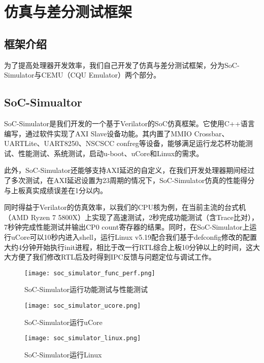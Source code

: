 \chapter{仿真与差分测试框架}

\section{框架介绍}

为了提高处理器开发效率，我们自己开发了仿真与差分测试框架，分为SoC-Simulator与CEMU（CQU Emulator）两个部分。

\section{SoC-Simualtor}

SoC-Simulator是我们开发的一个基于Verilator的SoC仿真框架。它使用C++语言编写，通过软件实现了AXI Slave设备功能。其内置了MMIO Crossbar、UARTLite、UART8250、NSCSCC confreg等设备，能够满足运行龙芯杯功能测试、性能测试、系统测试，启动u-boot、uCore和Linux的需求。

此外，SoC-Simulator还能够支持AXI延迟的自定义，在我们开发处理器期间经过了多次测试，在AXI延迟设置为23周期的情况下，SoC-Simulator仿真的性能得分与上板真实成绩误差在1分以内。

同时得益于Verilator的仿真效率，以我们的CPU核\cpuname 为例，在当前主流的台式机（AMD Ryzen 7 5800X）上实现了高速测试，2秒完成功能测试（含Trace比对），7秒钟完成性能测试并输出CP0 count寄存器的结果。同时，在SoC-Simulator上运行uCore可以10秒内进入shell，运行Linux v5.19配合我们基于defconfig修改的配置大约4分钟开始执行init进程，相比于改一行RTL综合上板10分钟以上的时间，这大大方便了我们修改RTL后及时得到IPC反馈与问题定位与调试工作。

\begin{figure}[h]
    \centering
    \texttt{[image: soc\_simulator\_func\_perf.png]}
    \caption{SoC-Simulator运行功能测试与性能测试}
\end{figure}

\begin{figure}[h]
    \centering
    \texttt{[image: soc\_simulator\_ucore.png]}
    \caption{SoC-Simulator运行uCore}
\end{figure}

\begin{figure}[h]
    \centering
    \texttt{[image: soc\_simulator\_linux.png]}
    \caption{SoC-Simulator运行Linux}
\end{figure}

